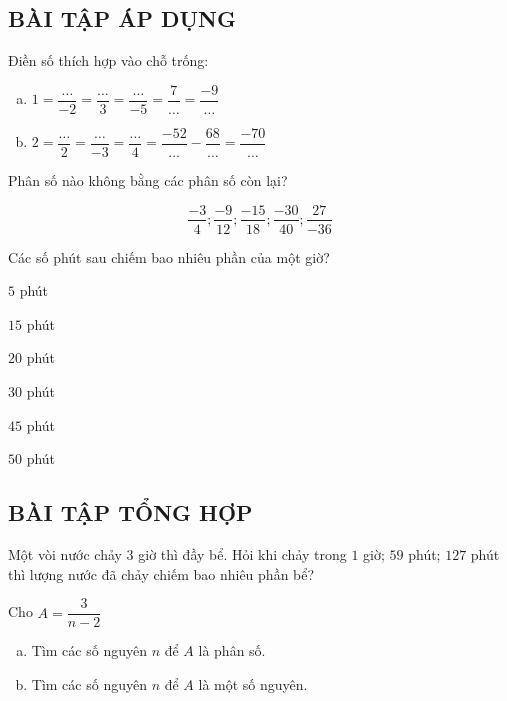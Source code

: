 \subsection{BÀI TẬP ÁP DỤNG}
\begin{bt}
Điền số thích hợp vào chỗ trống:
\begin{enumerate}[a)]
\item $1 = \dfrac{\ldots}{-2}=\dfrac{\ldots}{3} =\dfrac{\ldots}{-5} =\dfrac{7}{\ldots} = \dfrac{-9}{\ldots}$
\item $2 =\dfrac{\ldots}{2}=\dfrac{\ldots}{-3} =\dfrac{\ldots}{4} = \dfrac{-52}{\ldots} -\dfrac{68}{\ldots} =\dfrac{-70}{\ldots}$
\end{enumerate}

\end{bt}   \begin{bt}

Phân số nào không bằng các phân số còn lại?

 $$\dfrac{-3}{4}; \dfrac{-9}{12}; \dfrac{-15}{18}; \dfrac{-30}{40}; \dfrac{27}{-36}$$

\end{bt}   \begin{bt}

Các số phút sau chiếm bao nhiêu phần của một giờ?
\begin{multicols}{3}
\item $5$ phút
\item $15$ phút
\item $20$ phút
\item $30$ phút
\item $45$ phút
\item $50$ phút
\end{multicols}
\subsection{BÀI TẬP TỔNG HỢP}
\end{bt}   \begin{bt}

Một vòi nước chảy $3$ giờ thì đầy bể. Hỏi khi chảy trong $1$ giờ; $59$ phút; $127$ phút thì lượng nước đã chảy chiếm bao nhiêu phần bể?

\end{bt}   \begin{bt}

Cho $A = \dfrac{3}{n-2}$
\begin{enumerate}[a)]
\item Tìm các số nguyên $n$ để $A$ là phân số.
\item Tìm các số nguyên $n$ để $A$ là một số nguyên.
\end{enumerate}


\end{bt}
